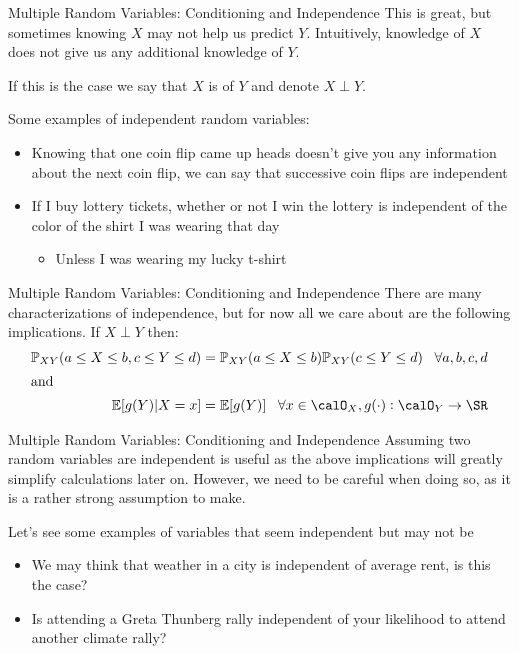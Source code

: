 \documentclass[notheorems,9pt, handout]{beamer}
\begin{document}
\begin{frame}{Multiple Random Variables: Conditioning and Independence} 
	\label{frame:mrv-independence}
	This is great, but sometimes knowing \(X\) may not help us predict \(Y\). Intuitively, knowledge of \(X\) does not give us any additional knowledge of \(Y\). 

	If this is the case we say that \(X\) is  of \(Y\) and denote \(X\perp Y\).

	Some examples of independent random variables:
	\begin{itemize}
		\item<2-> Knowing that one coin flip came up heads doesn't give you any information about the next coin flip, we can say that successive coin flips are independent
		\item<3-> If I buy lottery tickets, whether or not I win the lottery is independent of the color of the shirt I was wearing that day
		\begin{itemize}
			\item<4-> Unless I was wearing my lucky t-shirt
		\end{itemize}
	\end{itemize}
\end{frame}
\begin{frame}{Multiple Random Variables: Conditioning and Independence} 
	\label{frame:mrv-indep-charac}
	There are many characterizations of independence, but for now all we care about are the following implications. If \(X\perp Y\) then:
	\begin{align*}
		\P_{XY}(a\leq X\leq b, c\leq Y\leq d) &= \P_{XY}(a\leq X\leq b)\P_{XY}(c\leq Y\leq d)\;\;\;\forall a,b,c,d\\
		\intertext{and}
		\E[g(Y)|X=x] &= \E[g(Y)]\;\;\;\forall x\in\calO_X, g(\cdot):\calO_Y\to\SR
	\end{align*}
\end{frame}
\begin{frame}{Multiple Random Variables: Conditioning and Independence} 
	\label{frame:mrc-indep-careful}
	Assuming two random variables are independent is useful as the above implications will greatly simplify calculations later on. However, we need to be careful when doing so, as it is a rather strong assumption to make.

	Let's see some examples of variables that seem independent but may not be
	\begin{itemize}
		\item We may think that weather in a city is independent of average rent, is this the case?
		\item Is attending a Greta Thunberg rally independent of your likelihood to attend another climate rally?
	\end{itemize}
\end{frame}
\end{document}
